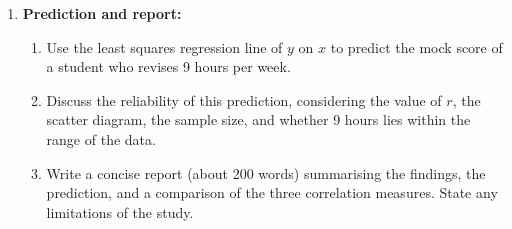\documentclass[11pt]{article}
\begin{document}
\begin{enumerate}
\begin{enumerate}
        \item Assign ranks to the $x$ values (already 1 to 11) and to the $y$ values (handle ties if any).
        \item Compute Spearman's rank correlation coefficient $R_s$.
        \item Compute Kendall's rank correlation coefficient $\tau$.
        \item Compare the three correlation coefficients ($r$, $R_s$, $\tau$) and comment on their similarities and differences.
    \end{enumerate}
    \item \textbf{Prediction and report:}
    \begin{enumerate}
        \item Use the least squares regression line of $y$ on $x$ to predict the mock score of a student who revises 9 hours per week.
        \item Discuss the reliability of this prediction, considering the value of $r$, the scatter diagram, the sample size, and whether 9 hours lies within the range of the data.
        \item Write a concise report (about 200 words) summarising the findings, the prediction, and a comparison of the three correlation measures. State any limitations of the study.
    \end{enumerate}
\end{enumerate}
\end{document}
